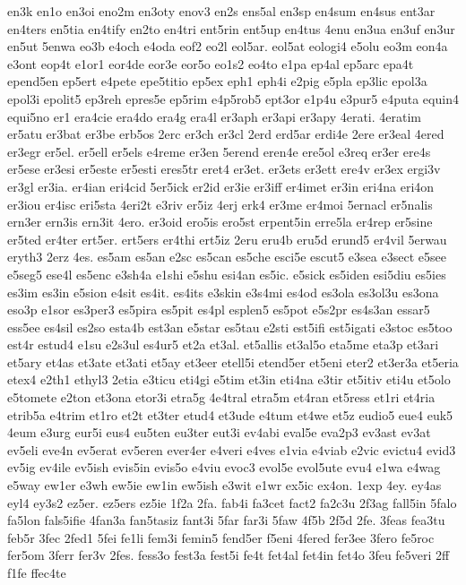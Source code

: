 {en3k
en1o
en3oi
eno2m
en3oty
enov3
en2s
ens5al
en3sp
en4sum
en4sus
ent3ar
en4ters
en5tia
en4tify
en2to
en4tri
ent5rin
ent5up
en4tus
4enu
en3ua
en3uf
en3ur
en5ut
5enwa
eo3b
e4och
e4oda
eof2
eo2l
eol5ar.
eol5at
eologi4
e5olu
eo3m
eon4a
e3ont
eop4t
e1or1
eor4de
eor3e
eor5o
eo1s2
eo4to
e1pa
ep4al
ep5arc
epa4t
epend5en
ep5ert
e4pete
epe5titio
ep5ex
eph1
eph4i
e2pig
e5pla
ep3lic
epol3a
epol3i
epolit5
ep3reh
epres5e
ep5rim
e4p5rob5
ept3or
e1p4u
e3pur5
e4puta
equin4
equi5no
er1
era4cie
era4do
era4g
era4l
er3aph
er3api
er3apy
4erati.
4eratim
er5atu
er3bat
er3be
erb5os
2erc
er3ch
er3cl
2erd
erd5ar
erdi4e
2ere
er3eal
4ered
er3egr
er5el.
er5ell
er5els
e4reme
er3en
5erend
eren4e
ere5ol
e3req
er3er
ere4s
er5ese
er3esi
er5este
er5esti
eres5tr
eret4
er3et.
er3ets
er3ett
ere4v
er3ex
ergi3v
er3gl
er3ia.
er4ian
eri4cid
5er5ick
er2id
er3ie
er3iff
er4imet
er3in
eri4na
eri4on
er3iou
er4isc
eri5sta
4eri2t
e3riv
er5iz
4erj
erk4
er3me
er4moi
5ernacl
er5nalis
ern3er
ern3is
ern3it
4ero.
er3oid
ero5is
ero5st
erpent5in
erre5la
er4rep
er5sine
er5ted
er4ter
ert5er.
ert5ers
er4thi
ert5iz
2eru
eru4b
eru5d
erund5
er4vil
5erwau
eryth3
2erz
4es.
es5am
es5an
e2sc
es5can
es5che
esci5e
escut5
e3sea
e3sect
e5see
e5seg5
ese4l
es5enc
e3sh4a
e1shi
e5shu
esi4an
es5ic.
e5sick
es5iden
esi5diu
es5ies
es3im
es3in
e5sion
e4sit
es4it.
es4its
e3skin
e3s4mi
es4od
es3ola
es3ol3u
es3ona
eso3p
e1sor
es3per3
es5pira
es5pit
es4pl
esplen5
es5pot
e5s2pr
es4s3an
essar5
ess5ee
es4sil
es2so
esta4b
est3an
e5star
es5tau
e2sti
est5ifi
est5igati
e3stoc
es5too
est4r
estud4
e1su
e2s3ul
es4ur5
et2a
et3al.
et5allis
et3al5o
eta5me
eta3p
et3ari
et5ary
et4as
et3ate
et3ati
et5ay
et3eer
etell5i
etend5er
et5eni
eter2
et3er3a
et5eria
etex4
e2th1
ethyl3
2etia
e3ticu
eti4gi
e5tim
et3in
eti4na
e3tir
et5itiv
eti4u
et5olo
e5tomete
e2ton
et3ona
etor3i
etra5g
4e4tral
etra5m
et4ran
et5ress
et1ri
et4ria
etrib5a
e4trim
et1ro
et2t
et3ter
etud4
et3ude
e4tum
et4we
et5z
eudio5
eue4
euk5
4eum
e3urg
eur5i
eus4
eu5ten
eu3ter
eut3i
ev4abi
eval5e
eva2p3
ev3ast
ev3at
ev5eli
eve4n
ev5erat
ev5eren
ever4er
e4veri
e4ves
e1via
e4viab
e2vic
evictu4
evid3
ev5ig
ev4ile
ev5ish
evis5in
evis5o
e4viu
evoc3
evol5e
evol5ute
evu4
e1wa
e4wag
e5way
ew1er
e3wh
ew5ie
ew1in
ew5ish
e3wit
e1wr
ex5ic
ex4on.
1exp
4ey.
ey4as
eyl4
ey3s2
ez5er.
ez5ers
ez5ie
1f2a
2fa.
fab4i
fa3cet
fact2
fa2c3u
2f3ag
fall5in
5falo
fa5lon
fals5ifie
4fan3a
fan5tasiz
fant3i
5far
far3i
5faw
4f5b
2f5d
2fe.
3feas
fea3tu
feb5r
3fec
2fed1
5fei
fe1li
fem3i
femin5
fend5er
f5eni
4fered
fer3ee
3fero
fe5roc
fer5om
3ferr
fer3v
2fes.
fess3o
fest3a
fest5i
fe4t
fet4al
fet4in
fet4o
3feu
fe5veri
2ff
f1fe
ffec4te
}
